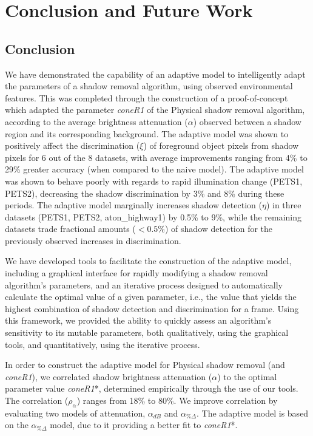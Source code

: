 \documentclass[12pt]{report}
\begin{document}
\doublespacing

\clearpage
\chapter{Conclusion and Future Work}

\section{Conclusion}

We have demonstrated the capability of an adaptive model to intelligently adapt the parameters of a shadow removal algorithm, using observed environmental features. This was completed through the construction of a proof-of-concept which adapted the parameter \textit{coneR1} of the Physical shadow removal algorithm, according to the average brightness attenuation ($\alpha$) observed between a shadow region and its corresponding background. The adaptive model was shown to positively affect the discrimination ($\xi$) of foreground object pixels from shadow pixels for 6 out of the 8 datasets, with average improvements ranging from 4\% to 29\% greater accuracy (when compared to the naive model). The adaptive model was shown to behave poorly with regards to rapid illumination change (PETS1, PETS2), decreasing the shadow discrimination by 3\% and 8\% during these periods. The adaptive model marginally increases shadow detection ($\eta$) in three datasets (PETS1, PETS2, aton\_highway1) by 0.5\% to 9\%, while the remaining datasets trade fractional amounts ($< 0.5\%$) of shadow detection for the previously observed increases in discrimination.

We have developed tools to facilitate the construction of the adaptive model, including a graphical interface for rapidly modifying a shadow removal algorithm's parameters, and an iterative process designed to automatically calculate the optimal value of a given parameter, i.e., the value that yields the highest combination of shadow detection and discrimination for a frame. Using this framework, we provided the ability to quickly assess an algorithm's sensitivity to its mutable parameters, both qualitatively, using the graphical tools, and quantitatively, using the iterative process.

In order to construct the adaptive model for Physical shadow removal (and \textit{coneR1}), we correlated shadow brightness attenuation ($\alpha$) to the optimal parameter value \textit{coneR1}*, determined empirically through the use of our tools. The correlation ($\rho_{\alpha}$) ranges from 18\% to 80\%. We improve correlation by evaluating two models of attenuation, $\alpha_{dB}$ and $\alpha_{\%\Delta}$. The adaptive model is based on the $\alpha_{\%\Delta}$ model, due to it providing a better fit to \textit{coneR1}*. 
\end{document}
